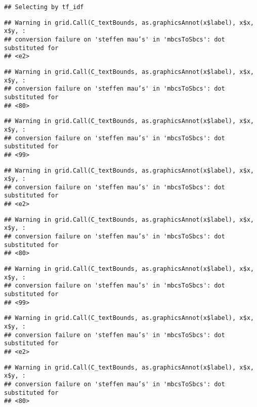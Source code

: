 \documentclass[]{article}
\begin{document}
\begin{verbatim}
## Selecting by tf_idf
\end{verbatim}

\begin{verbatim}
## Warning in grid.Call(C_textBounds, as.graphicsAnnot(x$label), x$x, x$y, :
## conversion failure on 'steffen mau’s' in 'mbcsToSbcs': dot substituted for
## <e2>
\end{verbatim}

\begin{verbatim}
## Warning in grid.Call(C_textBounds, as.graphicsAnnot(x$label), x$x, x$y, :
## conversion failure on 'steffen mau’s' in 'mbcsToSbcs': dot substituted for
## <80>
\end{verbatim}

\begin{verbatim}
## Warning in grid.Call(C_textBounds, as.graphicsAnnot(x$label), x$x, x$y, :
## conversion failure on 'steffen mau’s' in 'mbcsToSbcs': dot substituted for
## <99>
\end{verbatim}

\begin{verbatim}
## Warning in grid.Call(C_textBounds, as.graphicsAnnot(x$label), x$x, x$y, :
## conversion failure on 'steffen mau’s' in 'mbcsToSbcs': dot substituted for
## <e2>
\end{verbatim}

\begin{verbatim}
## Warning in grid.Call(C_textBounds, as.graphicsAnnot(x$label), x$x, x$y, :
## conversion failure on 'steffen mau’s' in 'mbcsToSbcs': dot substituted for
## <80>
\end{verbatim}

\begin{verbatim}
## Warning in grid.Call(C_textBounds, as.graphicsAnnot(x$label), x$x, x$y, :
## conversion failure on 'steffen mau’s' in 'mbcsToSbcs': dot substituted for
## <99>
\end{verbatim}

\begin{verbatim}
## Warning in grid.Call(C_textBounds, as.graphicsAnnot(x$label), x$x, x$y, :
## conversion failure on 'steffen mau’s' in 'mbcsToSbcs': dot substituted for
## <e2>
\end{verbatim}

\begin{verbatim}
## Warning in grid.Call(C_textBounds, as.graphicsAnnot(x$label), x$x, x$y, :
## conversion failure on 'steffen mau’s' in 'mbcsToSbcs': dot substituted for
## <80>
\end{verbatim}
\end{document}
